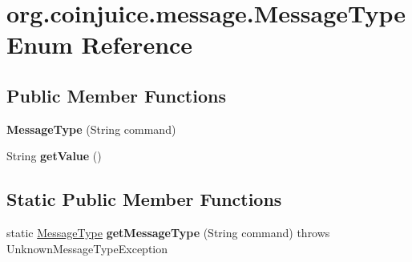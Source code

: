 \hypertarget{enumorg_1_1coinjuice_1_1message_1_1_message_type}{\section{org.\-coinjuice.\-message.\-Message\-Type Enum Reference}
\label{enumorg_1_1coinjuice_1_1message_1_1_message_type}
}
\subsection*{Public Member Functions}
\begin{DoxyCompactItemize}
\item 
\hypertarget{enumorg_1_1coinjuice_1_1message_1_1_message_type_ad75b614e65dfbef7e4aa597201099b69}{{\bfseries Message\-Type} (String command)}\label{enumorg_1_1coinjuice_1_1message_1_1_message_type_ad75b614e65dfbef7e4aa597201099b69}

\item 
\hypertarget{enumorg_1_1coinjuice_1_1message_1_1_message_type_aa70eaf4dbfbf76a9450a97fe194c9292}{String {\bfseries get\-Value} ()}\label{enumorg_1_1coinjuice_1_1message_1_1_message_type_aa70eaf4dbfbf76a9450a97fe194c9292}

\end{DoxyCompactItemize}
\subsection*{Static Public Member Functions}
\begin{DoxyCompactItemize}
\item 
\hypertarget{enumorg_1_1coinjuice_1_1message_1_1_message_type_a1bcd3d78bb2727ee1f1a13bf92762d32}{static \hyperlink{enumorg_1_1coinjuice_1_1message_1_1_message_type}{Message\-Type} {\bfseries get\-Message\-Type} (String command)  throws Unknown\-Message\-Type\-Exception }\label{enumorg_1_1coinjuice_1_1message_1_1_message_type_a1bcd3d78bb2727ee1f1a13bf92762d32}

\end{DoxyCompactItemize}
